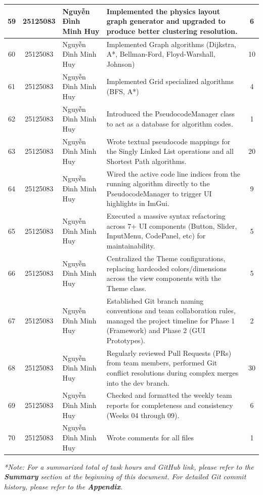 \begin{center}
\begin{longtable}{|c|c|p{3.2cm}|p{6.5cm}|c|}
59 & 25125083 & Nguyễn Đình Minh Huy & Implemented the physics layout graph generator and upgraded to produce better clustering resolution. & 6 \\ \hline
60 & 25125083 & Nguyễn Đình Minh Huy & Implemented Graph algorithms (Dijkstra, A*, Bellman-Ford, Floyd-Warshall, Johnson) & 10 \\ \hline
61 & 25125083 & Nguyễn Đình Minh Huy & Implemented Grid specialized algorithms (BFS, A*) & 4 \\ \hline
62 & 25125083 & Nguyễn Đình Minh Huy & Introduced the PseudocodeManager class to act as a database for algorithm codes. & 1 \\ \hline
63 & 25125083 & Nguyễn Đình Minh Huy & Wrote textual pseudocode mappings for the Singly Linked List operations and all Shortest Path algorithms. & 20 \\ \hline
64 & 25125083 & Nguyễn Đình Minh Huy & Wired the active code line indices from the running algorithm directly to the PseudocodeManager to trigger UI highlights in ImGui. & 9 \\ \hline
65 & 25125083 & Nguyễn Đình Minh Huy & Executed a massive syntax refactoring across 7+ UI components (Button, Slider, InputMenu, CodePanel, etc) for maintainability. & 5 \\ \hline
66 & 25125083 & Nguyễn Đình Minh Huy & Centralized the Theme configurations, replacing hardcoded colors/dimensions across the view components with the Theme class. & 5 \\ \hline
67 & 25125083 & Nguyễn Đình Minh Huy & Established Git branch naming conventions and team collaboration rules, managed the project timeline for Phase 1 (Framework) and Phase 2 (GUI Prototypes). & 2 \\ \hline
68 & 25125083 & Nguyễn Đình Minh Huy & Regularly reviewed Pull Requests (PRs) from team members, performed Git conflict resolutions during complex merges into the dev branch. & 30 \\ \hline
69 & 25125083 & Nguyễn Đình Minh Huy & Checked and formatted the weekly team reports for completeness and consistency (Weeks 04 through 09). & 6 \\ \hline
70 & 25125083 & Nguyễn Đình Minh Huy & Wrote comments for all files & 1 \\ \hline
\end{longtable}
\end{center}


\textit{*Note: For a summarized total of task hours and GitHub link, please refer to the \textbf{Summary} section at the beginning of this document. For detailed Git commit history, please refer to the \textbf{Appendix}.}
